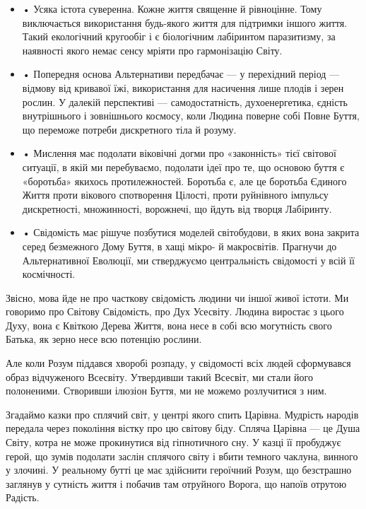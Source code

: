 \begin{itemize}
	

\item • Усяка істота суверенна. Кожне життя священне й рівноцінне. Тому виключається
використання будь-якого життя для підтримки іншого життя. Такий екологічний
кругообіг і є біологічним лабіринтом паразитизму, за наявності якого немає
сенсу мріяти про гармонізацію Світу.

\item • Попередня основа Альтернативи передбачає — у перехідний період — відмову від
кривавої їжі, використання для насичення лише плодів і зерен рослин. У далекій
перспективі — самодостатність, духоенергетика, єдність внутрішнього і
зовнішнього космосу, коли Людина поверне собі Повне Буття, що переможе потреби
дискретного тіла й розуму.

\item • Мислення має подолати віковічні догми про «законність» тієї світової
ситуації, в якій ми перебуваємо, подолати ідеї про те, що основою буття є
«боротьба» якихось протилежностей. Боротьба є, але це боротьба Єдиного Життя
проти вікового спотворення Цілості, проти руйнівного імпульсу дискретності,
множинності, ворожнечі, що йдуть від творця Лабіринту.

\item • Свідомість має рішуче позбутися моделей світобудови, в яких вона закрита
серед безмежного Дому Буття, в хащі мікро- й макросвітів. Прагнучи до
Альтернативної Еволюції, ми стверджуємо центральність свідомості у всій її
космічності.

\end{itemize}

Звісно, мова йде не про часткову свідомість людини чи іншої живої істоти. Ми
говоримо про Світову Свідомість, про Дух Усесвіту. Людина виростає з цього
Духу, вона є Квіткою Дерева Життя, вона несе в собі всю могутність свого
Батька, як зерно несе всю потенцію рослини.

Але коли Розум піддався хворобі розпаду, у свідомості всіх людей сформувався
образ відчуженого Всесвіту. Утвердивши такий Всесвіт, ми стали його полоненими.
Створивши ілюзіон Буття, ми не можемо розлучитися з ним.

Згадаймо казки про сплячий світ, у центрі якого спить Царівна. Мудрість народів
передала через покоління вістку про цю світову біду. Спляча Царівна — це Душа
Світу, котра не може прокинутися від гіпнотичного сну. У казці її пробуджує
герой, що зумів подолати заслін сплячого світу і вбити темного чаклуна, винного
у злочині. У реальному бутті це має здійснити героїчний Розум, що безстрашно
заглянув у сутність життя і побачив там отруйного Ворога, що напоїв отрутою
Радість.

